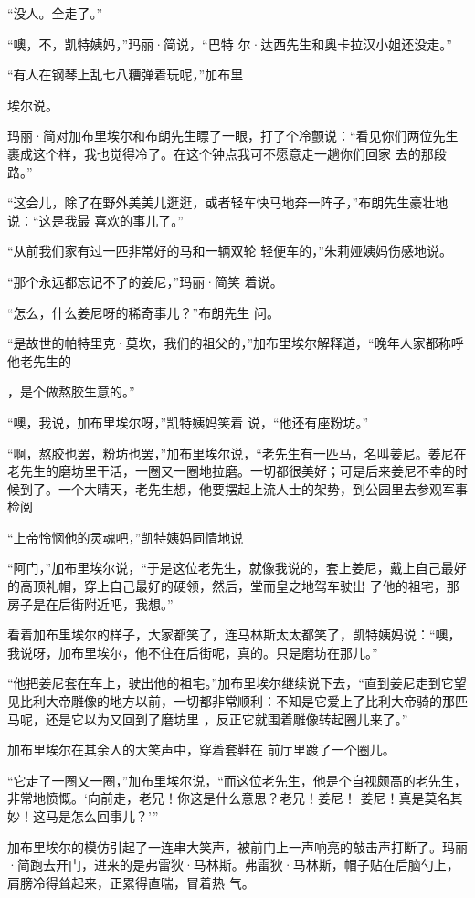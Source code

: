 \documentclass{article}
\begin{document}
“没人。全走了。” 

“噢，不，凯特姨妈，”玛丽·简说，“巴特
尔·达西先生和奥卡拉汉小姐还没走。” 

“有人在钢琴上乱七八糟弹着玩呢，”加布里

\newpage
埃尔说。 

玛丽·简对加布里埃尔和布朗先生瞟了一眼，打了个冷颤说：“看见你们两位先生裹成这个样，我也觉得冷了。在这个钟点我可不愿意走一趟你们回家
去的那段路。” 

“这会儿，除了在野外美美儿逛逛，或者轻车快马地奔一阵子，”布朗先生豪壮地说：“这是我最
喜欢的事儿了。” 

“从前我们家有过一匹非常好的马和一辆双轮
轻便车的，”朱莉娅姨妈伤感地说。 

“那个永远都忘记不了的姜尼，”玛丽·简笑
着说。 

“怎么，什么姜尼呀的稀奇事儿？”布朗先生
问。 

“是故世的帕特里克·莫坎，我们的祖父的，”加布里埃尔解释道，“晚年人家都称呼他老先生的
\newpage

，是个做熬胶生意的。” 

“噢，我说，加布里埃尔呀，”凯特姨妈笑着
说，“他还有座粉坊。” 

“啊，熬胶也罢，粉坊也罢，”加布里埃尔说，“老先生有一匹马，名叫姜尼。姜尼在老先生的磨坊里干活，一圈又一圈地拉磨。一切都很美好；可是后来姜尼不幸的时候到了。一个大晴天，老先生想，他要摆起上流人士的架势，到公园里去参观军事检阅

“上帝怜悯他的灵魂吧，”凯特姨妈同情地说

“阿门，”加布里埃尔说，“于是这位老先生，就像我说的，套上姜尼，戴上自己最好的高顶礼帽，穿上自己最好的硬领，然后，堂而皇之地驾车驶出
了他的祖宅，那房子是在后街附近吧，我想。” 

看着加布里埃尔的样子，大家都笑了，连马林斯太太都笑了，凯特姨妈说：“噢，我说呀，加布里埃尔，他不住在后街呢，真的。只是磨坊在那儿。”
\newpage


“他把姜尼套在车上，驶出他的祖宅。”加布里埃尔继续说下去，“直到姜尼走到它望见比利大帝雕像的地方以前，一切都非常顺利：不知是它爱上了比利大帝骑的那匹马呢，还是它以为又回到了磨坊里
，反正它就围着雕像转起圈儿来了。” 

加布里埃尔在其余人的大笑声中，穿着套鞋在
前厅里踱了一个圈儿。 

“它走了一圈又一圈，”加布里埃尔说，“而这位老先生，他是个自视颇高的老先生，非常地愤慨。‘向前走，老兄！你这是什么意思？老兄！姜尼！
姜尼！真是莫名其妙！这马是怎么回事儿？’” 

加布里埃尔的模仿引起了一连串大笑声，被前门上一声响亮的敲击声打断了。玛丽·简跑去开门，进来的是弗雷狄·马林斯。弗雷狄·马林斯，帽子贴在后脑勺上，肩膀冷得耸起来，正累得直喘，冒着热
气。 
\end{document}
